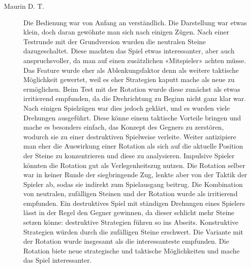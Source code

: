 \documentclass[a4paper,11pt,hidelinks]{scrartcl}
\begin{document}
\begin{description}
    \item[Maurin D. T.] Die Bedienung war von Anfang an verständlich. Die Darstellung war etwas klein, doch daran gewöhnte man sich nach einigen Zügen. Nach einer Testrunde mit der Grundversion wurden die neutralen Steine dazugeschaltet. Diese machten das Spiel etwas interessanter, aber auch anspruchsvoller, da man auf einen zusätzlichen «Mitspieler» achten müsse. Das Feature wurde eher als Ablenkungsfaktor denn als weitere taktische Möglichkeit gewertet, weil es eher Strategien kaputt mache als neue zu ermöglichen. Beim Test mit der Rotation wurde diese zunächst als etwas irritierend empfunden, da die Drehrichtung zu Beginn nicht ganz klar war. Nach einigen Spielzügen war dies jedoch geklärt, und es wurden viele Drehungen ausgeführt. Diese könne einem taktische Vorteile bringen und mache es besonders einfach, das Konzept des Gegners zu zerstören, wodurch sie zu einer destruktiven Spielweise verleite. Weiter antizipiere man eher die Auswirkung einer Rotation als sich auf die aktuelle Position der Steine zu konzentrieren und diese zu analysieren. Impulsive Spieler könnten die Rotation gut als Verlegenheitszug nutzen. Die Rotation selber war in keiner Runde der siegbringende Zug, lenkte aber von der Taktik der Spieler ab, sodas sie indirekt zum Spielausgang beitrug. Die Kombination von neutralen, zufälligen Steinen und der Rotation wurde als irritierend empfunden. Ein destruktives Spiel mit ständigen Drehungen eines Spielers lässt in der Regel den Gegner gewinnen, da dieser schlicht mehr Steine setzen könne: destruktive Strategien führen so ins Abseits. Konstruktive Strategien würden durch die zufälligen Steine erschwert. Die Variante mit der Rotation wurde insgesamt als die interessanteste empfunden. Die Rotation biete neue strategische und taktische Möglichkeiten und mache das Spiel interessanter.

\end{description}
\end{document}
